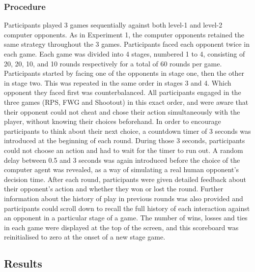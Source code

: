 \documentclass[smallextended]{svjour3}       %
\begin{document}
\hypertarget{procedure-1}{%
\subsubsection{Procedure}\label{procedure-1}}

Participants played 3 games sequentially against both level-1 and
level-2 computer opponents. As in Experiment 1, the computer opponents
retained the same strategy throughout the 3 games. Participants faced
each opponent twice in each game. Each game was divided into 4 stages,
numbered 1 to 4, consisting of 20, 20, 10, and 10 rounds respectively
for a total of 60 rounds per game. Participants started by facing one of
the opponents in stage one, then the other in stage two. This was
repeated in the same order in stages 3 and 4. Which opponent they faced
first was counterbalanced. All participants engaged in the three games
(RPS, FWG and Shootout) in this exact order, and were aware that their
opponent could not cheat and chose their action simultaneously with the
player, without knowing their choices beforehand. In order to encourage
participants to think about their next choice, a countdown timer of 3
seconds was introduced at the beginning of each round. During those 3
seconds, participants could not choose an action and had to wait for the
timer to run out. A random delay between 0.5 and 3 seconds was again
introduced before the choice of the computer agent was revealed, as a
way of simulating a real human opponent's decision time. After each
round, participants were given detailed feedback about their opponent's
action and whether they won or lost the round. Further information about
the history of play in previous rounds was also provided and
participants could scroll down to recall the full history of each
interaction against an opponent in a particular stage of a game. The
number of wins, losses and ties in each game were displayed at the top
of the screen, and this scoreboard was reinitialised to zero at the
onset of a new stage game.

\hypertarget{results-1}{%
\subsection{Results}\label{results-1}}
\end{document}
